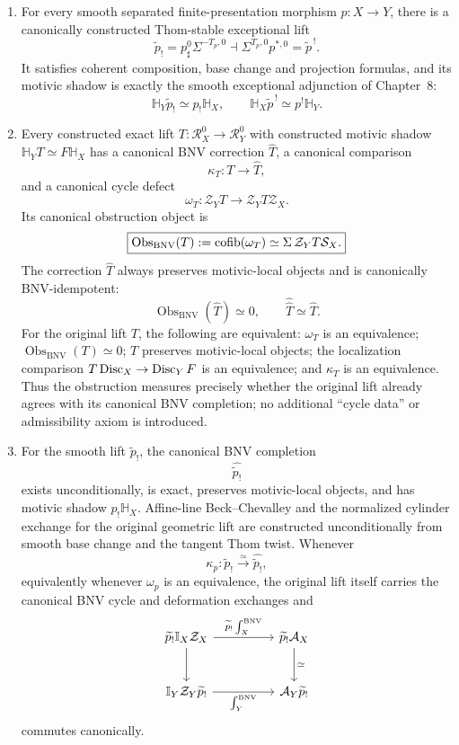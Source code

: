 \begin{theorem}
\begin{enumerate}
\item For every smooth separated finite-presentation morphism
\(p:X\to Y\), there is a canonically constructed Thom-stable exceptional lift
\[
  \boxed{
  \widetilde p_!
  =p_\sharp^0\Sigma^{-T_p,0}
  \dashv
  \Sigma^{T_p,0}p^{*,0}
  =\widetilde p^{\,!}.
  }
\]
It satisfies coherent composition, base change and projection formulas, and
its motivic shadow is exactly the smooth exceptional adjunction of Chapter~8:
\[
  \boxed{
  \mathbb H_Y\widetilde p_!
  \simeq
  p_!\mathbb H_X,
  \qquad
  \mathbb H_X\widetilde p^{\,!}
  \simeq
  p^!\mathbb H_Y.
  }
\]

\item Every constructed exact lift
\(T:\mathcal R_X^0\to\mathcal R_Y^0\) with constructed motivic shadow
\(\mathbb H_YT\simeq F\mathbb H_X\) has a canonical BNV correction
\(\widehat T\), a canonical comparison
\[
  \kappa_T:T\to\widehat T,
\]
and a canonical cycle defect
\[
  \boxed{
  \omega_T:
  \mathcal Z_YT
  \longrightarrow
  \mathcal Z_YT\mathcal Z_X.
  }
\]
Its canonical obstruction object is
\[
  \boxed{
  \operatorname{Obs}_{\mathrm{BNV}}(T)
  :=\operatorname{cofib}(\omega_T)
  \simeq
  \Sigma\,\mathcal Z_YT\mathcal S_X.
  }
\]
The correction \(\widehat T\) always preserves motivic-local objects and is
canonically BNV-idempotent:
\[
  \operatorname{Obs}_{\mathrm{BNV}}(\widehat T)\simeq0,
  \qquad
  \widehat{\widehat T}\simeq\widehat T.
\]
For the original lift \(T\), the following are equivalent:
\(\omega_T\) is an equivalence;
\(\operatorname{Obs}_{\mathrm{BNV}}(T)\simeq0\); \(T\) preserves
motivic-local objects; the localization comparison
\(T\operatorname{Disc}_X\to\operatorname{Disc}_YF\) is an equivalence; and
\(\kappa_T\) is an equivalence.  Thus the obstruction measures precisely
whether the original lift already agrees with its canonical BNV completion;
no additional ``cycle data'' or admissibility axiom is introduced.

\item For the smooth lift \(\widetilde p_!\), the canonical BNV completion
\[
  \widehat{\widetilde p_!}
\]
exists unconditionally, is exact, preserves motivic-local objects, and has
motivic shadow \(p_!\mathbb H_X\).  Affine-line Beck--Chevalley and the
normalized cylinder exchange for the original geometric lift are constructed
unconditionally from smooth base change and the tangent Thom twist.  Whenever
\[
  \kappa_p:
  \widetilde p_!
  \xrightarrow{\simeq}
  \widehat{\widetilde p_!},
\]
equivalently whenever \(\omega_p\) is an equivalence, the original lift itself
carries the canonical BNV cycle and deformation exchanges and
\[
\begin{tikzcd}[column sep=huge,row sep=large]
\widetilde p_!\mathbb I_X\mathcal Z_X
  \ar[r,"\widetilde p_!\int_X^{\mathrm{BNV}}"]
  \ar[d]
&
\widetilde p_!\mathcal A_X
  \ar[d,"\simeq"]
\\
\mathbb I_Y\mathcal Z_Y\widetilde p_!
  \ar[r,"\int_Y^{\mathrm{BNV}}"']
&
\mathcal A_Y\widetilde p_!
\end{tikzcd}
\]
commutes canonically.


\end{enumerate}
\end{theorem}
